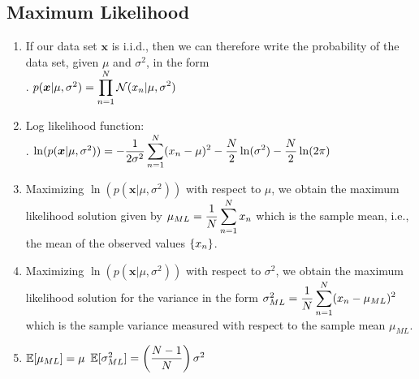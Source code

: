 \subsection{Maximum Likelihood}

\begin{enumerate}
    \item If our data set $\bm{x}$ is i.i.d., then we can therefore write the probability of the data set, given $\mu$  and $\sigma^2$, in the form
    \hfill \cite{ml/book/Pattern-Recognition-And-Machine-Learning/Christopher-M-Bishop}
    \\
    .\hfill
    $
        p(\bm{x}|\mu , \sigma^2)
        = \displaystyle\prod^{N}_{n=1} \mathcal{N} (x_n|\mu , \sigma^2)
    $
    \hfill \cite{ml/book/Pattern-Recognition-And-Machine-Learning/Christopher-M-Bishop}

    \item Log likelihood function:
    \hfill \cite{ml/book/Pattern-Recognition-And-Machine-Learning/Christopher-M-Bishop}
    \\
    .\hfill
    $
        \ln (p (\bm{x}|\mu , \sigma ^2))
        = - \dfrac{1}{2\sigma ^2} \displaystyle\sum^N_{n=1} (x_n - \mu )^2 - \dfrac{N }{2} \ln (\sigma ^2) - \dfrac{N }{2} \ln(2\pi)
    $
    \hfill \cite{ml/book/Pattern-Recognition-And-Machine-Learning/Christopher-M-Bishop}

    \item Maximizing $\ln (p (\bm{x}|\mu , \sigma ^2))$ with respect to $\mu$, we obtain the maximum likelihood solution given by
    $
        \mu_{ML}
        = \dfrac{1}{N} \displaystyle\sum_{n=1}^N x_n
    $
    which is the sample mean, i.e., the mean of the observed values $\left\{x_n\right\}$.
    \hfill \cite{ml/book/Pattern-Recognition-And-Machine-Learning/Christopher-M-Bishop}

    \item Maximizing $\ln (p (\bm{x}|\mu , \sigma ^2))$ with respect to $\sigma^2$, we obtain the maximum likelihood solution for the variance in the form
    $
        \sigma^2 _{ML} = \dfrac{1}{N} \displaystyle\sum^N _{n=1} (x_n - \mu _{ML})^2
    $
    which is the sample variance measured with respect to the sample mean $\mu _{ML}$.
    \hfill \cite{ml/book/Pattern-Recognition-And-Machine-Learning/Christopher-M-Bishop}

    \item
    $\mathbb{E}[\mu _{ML}] = \mu $
    \hfill
    $\mathbb{E}[\sigma ^2_{ML}] = \left(\dfrac{N - 1}{N}\right) \sigma ^2$
    \hfill \cite{ml/book/Pattern-Recognition-And-Machine-Learning/Christopher-M-Bishop}
\end{enumerate}







